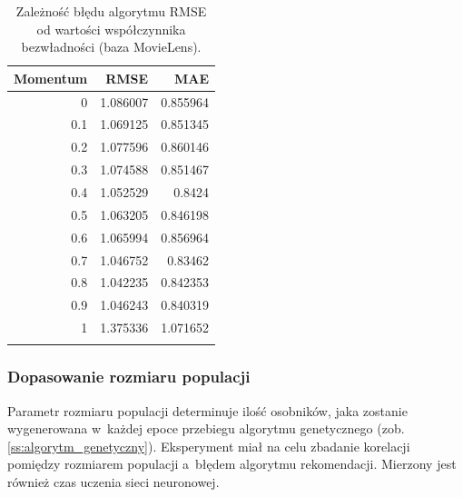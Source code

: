 \documentclass[twoside]{iisthesis}
\begin{document}
			\begin{longtable}{r||rr}
				\label{tab:expmomentum}
				\textbf{Momentum} & \textbf{RMSE} & \textbf{MAE} \\
				\hline
				0        & 1.086007 & 0.855964 \\
				0.1      & 1.069125 & 0.851345 \\
				0.2      & 1.077596 & 0.860146 \\
				0.3      & 1.074588 & 0.851467 \\
				0.4      & 1.052529 & 0.8424   \\
				0.5      & 1.063205 & 0.846198 \\
				0.6      & 1.065994 & 0.856964 \\
				0.7      & 1.046752 & 0.83462  \\
				0.8      & 1.042235 & 0.842353 \\
				0.9      & 1.046243 & 0.840319 \\
				1        & 1.375336 & 1.071652 \\
				\caption{Zależność błędu algorytmu RMSE od wartości współczynnika bezwładności (baza MovieLens).}
			\end{longtable}
						
			\subsubsection{Dopasowanie rozmiaru populacji}
		
			Parametr rozmiaru populacji determinuje ilość osobników, jaka zostanie wygenerowana w~każdej epoce przebiegu algorytmu genetycznego (zob. \ref{ss:algorytm_genetyczny}). Eksperyment miał na celu zbadanie korelacji pomiędzy rozmiarem populacji a~błędem algorytmu rekomendacji. Mierzony jest również czas uczenia sieci neuronowej.
			
\end{document}
